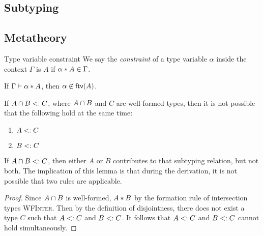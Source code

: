 \subsection{Subtyping}

\subsection{Metatheory}

\begin{definition}{Type variable constraint}
We say the \emph{constraint} of a type variable $\alpha$ inside the context $\Gamma$ is $A$ if $\alpha * A \in \Gamma$.
\end{definition}

%

\begin{lemma} \label{free-var-disjoint-bounds}
  If $\Gamma \vdash \alpha * A$, then $\alpha \not \in \textsf{ftv}(A)$.
\end{lemma}

\begin{lemma} \label{unique-subtype-contributor}
If $A \cap B <: C$, where $A \cap B$ and $C$ are well-formed types, then it is not possible that the following hold at the same time:
\begin{enumerate}
\item $A <: C$
\item $B <: C$
\end{enumerate}
\end{lemma}

If $A \cap B <: C$, then either $A$ or $B$ contributes to that subtyping relation, but not both. The implication of this lemma is that during the derivation, it is not possible that two rules are applicable.

\newcommand{\wfinterlabel}{\textsc{WFInter}}

\begin{proof}
Since $A \cap B$ is well-formed, $A * B$ by the formation rule of intersection types \wfinterlabel. Then by the definition of disjointness, there does not exist a type $C$ such that $A <: C$ and $B <: C$. It follows that $A <: C$ and $B <: C$ cannot hold simultaneously.
\end{proof}

